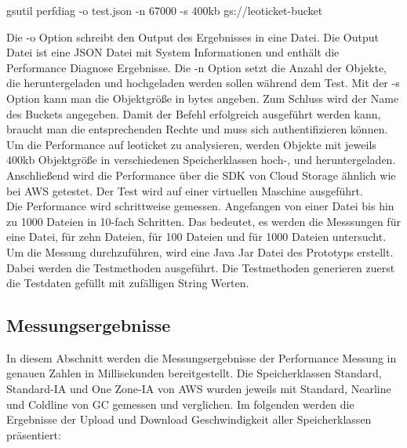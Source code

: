\begin{code} gsutil perfdiag -o test.json -n 67000 -s 400kb gs://leoticket-bucket \end{code}

Die -o Option schreibt den Output des Ergebnisses in eine Datei. Die Output Datei ist eine JSON Datei mit System Informationen und enthält die Performance Diagnose Ergebnisse. Die -n Option setzt die Anzahl der Objekte, die heruntergeladen und hochgeladen werden sollen während dem Test. Mit der -s Option kann man die Objektgröße in bytes angeben. Zum Schluss wird der Name des Buckets angegeben. Damit der Befehl erfolgreich ausgeführt werden kann, braucht man die entsprechenden Rechte und muss sich authentifizieren können.\\

Um die Performance auf leoticket zu analysieren, werden Objekte mit jeweils 400kb Objektgröße in verschiedenen Speicherklassen hoch-, und heruntergeladen. Anschließend wird die Performance über die SDK von Cloud Storage ähnlich wie bei AWS getestet. Der Test wird auf einer virtuellen Maschine ausgeführt.\\

Die Performance wird schrittweise gemessen. Angefangen von einer Datei bis hin zu 1000 Dateien in 10-fach Schritten. Das bedeutet, es werden die Messsungen für eine Datei, für zehn Dateien, für 100 Dateien und für 1000 Dateien untersucht. Um die Messung durchzuführen, wird eine Java Jar Datei des Prototyps erstellt. Dabei werden die Testmethoden ausgeführt. Die Testmethoden generieren zuerst die Testdaten gefüllt mit zufälligen String Werten.

\newpage

\subsection{Messungsergebnisse}

In diesem Abschnitt werden die Messungsergebnisse der Performance Messung in genauen Zahlen in Millisekunden bereitgestellt. Die Speicherklassen Standard, Standard-IA und One Zone-IA von AWS wurden jeweils mit Standard, Nearline und Coldline von GC gemessen und verglichen. Im folgenden werden die Ergebnisse der Upload und Download Geschwindigkeit aller Speicherklassen präsentiert:

